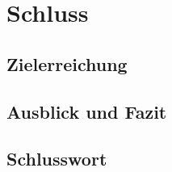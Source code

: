 \clearpage
\section{Schluss}\label{sec:Schluss}

\subsection{Zielerreichung}\label{subsec:Zielerreichung}


\subsection{Ausblick und Fazit}\label{subsec:AusblickundFazit}



\subsection{Schlusswort}\label{subsec:Schlusswort}

